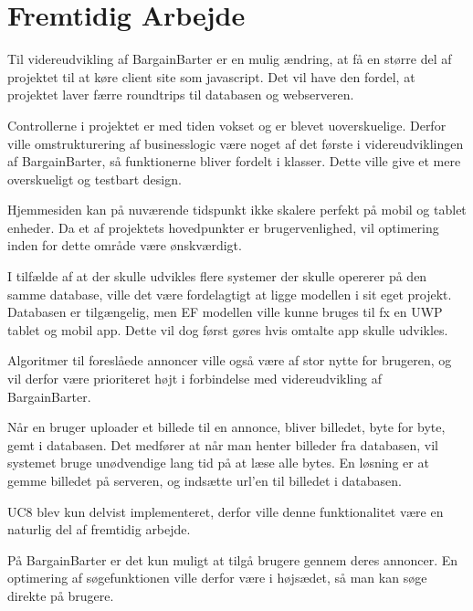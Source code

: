 \chapter{Fremtidig Arbejde}

Til videreudvikling af BargainBarter er en mulig ændring, at få en større del af projektet til at køre client site som javascript. Det vil have den fordel, at projektet laver færre roundtrips til databasen og webserveren. 

\noindent Controllerne i projektet er med tiden vokset og er blevet uoverskuelige. Derfor ville omstrukturering af businesslogic være noget af det første i videreudviklingen af BargainBarter, så funktionerne bliver fordelt i klasser. Dette ville give et mere overskueligt og testbart design.

\noindent Hjemmesiden kan på nuværende tidspunkt ikke skalere perfekt på mobil og tablet enheder. Da et af projektets hovedpunkter er brugervenlighed, vil optimering inden for dette område være ønskværdigt.

\noindent I tilfælde af at der skulle udvikles flere systemer der skulle opererer på den samme database, ville det være fordelagtigt at ligge modellen i sit eget projekt. Databasen er tilgængelig, men EF modellen ville kunne bruges til fx en UWP tablet og mobil app. Dette vil dog først gøres hvis omtalte app skulle udvikles. 

\noindent Algoritmer til foreslåede annoncer ville også være af stor nytte for brugeren, og vil derfor være prioriteret højt i forbindelse med videreudvikling af BargainBarter. 

\noindent Når en bruger uploader et billede til en annonce, bliver billedet, byte for byte, gemt i databasen. Det medfører at når man henter billeder fra databasen, vil systemet bruge unødvendige lang tid på at læse alle bytes. En løsning er at gemme billedet på serveren, og indsætte url'en til billedet i databasen. 

\noindent UC8 blev kun delvist implementeret, derfor ville denne funktionalitet være en naturlig del af fremtidig arbejde.

\noindent På BargainBarter er det kun muligt at tilgå brugere gennem deres annoncer. En optimering af søgefunktionen ville derfor være i højsædet, så man kan søge direkte på brugere. 
 